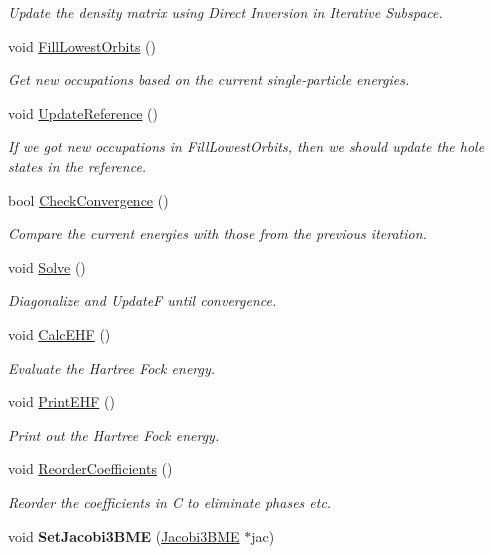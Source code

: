 \begin{DoxyCompactItemize}
\begin{DoxyCompactList}\small\item\em Update the density matrix using Direct Inversion in Iterative Subspace. \end{DoxyCompactList}\item 
void \hyperlink{classHartreeFock_a74c842cbf4e8caec72591c1205794f1f}{Fill\-Lowest\-Orbits} ()
\begin{DoxyCompactList}\small\item\em Get new occupations based on the current single-\/particle energies. \end{DoxyCompactList}\item 
\hypertarget{classHartreeFock_af7dbc7d8aa192f192f23347c46ad084c}{void \hyperlink{classHartreeFock_af7dbc7d8aa192f192f23347c46ad084c}{Update\-Reference} ()}\label{classHartreeFock_af7dbc7d8aa192f192f23347c46ad084c}

\begin{DoxyCompactList}\small\item\em If we got new occupations in Fill\-Lowest\-Orbits, then we should update the hole states in the reference. \end{DoxyCompactList}\item 
bool \hyperlink{classHartreeFock_a35ab9c4f96e68b1c9acea1d1407ecc60}{Check\-Convergence} ()
\begin{DoxyCompactList}\small\item\em Compare the current energies with those from the previous iteration. \end{DoxyCompactList}\item 
void \hyperlink{classHartreeFock_a0666507747c17845ab4f74b97414703c}{Solve} ()
\begin{DoxyCompactList}\small\item\em Diagonalize and Update\-F until convergence. \end{DoxyCompactList}\item 
void \hyperlink{classHartreeFock_aef506c5c5bc0f317ceb9c71bdc44d62b}{Calc\-E\-H\-F} ()
\begin{DoxyCompactList}\small\item\em Evaluate the Hartree Fock energy. \end{DoxyCompactList}\item 
void \hyperlink{classHartreeFock_a2c3bdda2ea86f9a3b18d203c9aecc353}{Print\-E\-H\-F} ()
\begin{DoxyCompactList}\small\item\em Print out the Hartree Fock energy. \end{DoxyCompactList}\item 
void \hyperlink{classHartreeFock_a2eb6754f57250a03a2e1bd3e2aef4daf}{Reorder\-Coefficients} ()
\begin{DoxyCompactList}\small\item\em Reorder the coefficients in C to eliminate phases etc. \end{DoxyCompactList}\item 
\hypertarget{classHartreeFock_a94e029d6a9091ed2dbf1b1b54a03ceb7}{void {\bfseries Set\-Jacobi3\-B\-M\-E} (\hyperlink{classJacobi3BME}{Jacobi3\-B\-M\-E} $\ast$jac)}\label{classHartreeFock_a94e029d6a9091ed2dbf1b1b54a03ceb7}


\end{DoxyCompactItemize}
